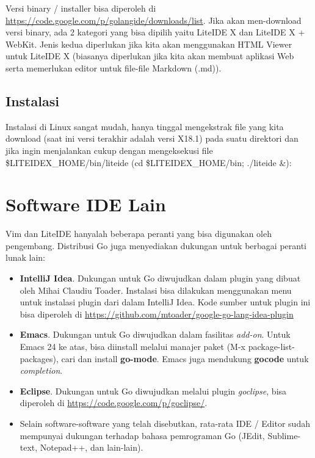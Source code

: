 Versi binary / installer bisa diperoleh di \url{https://code.google.com/p/golangide/downloads/list}. Jika akan men-download versi binary, ada 2 kategori yang bisa dipilih yaitu LiteIDE X dan LiteIDE X + WebKit. Jenis kedua diperlukan jika kita akan menggunakan HTML Viewer untuk LiteIDE X (biasanya diperlukan jika kita akan membuat aplikasi Web serta memerlukan editor untuk file-file Markdown (.md)).

\subsection{Instalasi}

Instalasi di Linux sangat mudah, hanya tinggal mengekstrak file yang kita download (saat ini versi terakhir adalah versi X18.1) pada suatu direktori dan jika ingin menjalankan cukup dengan mengeksekusi file \$LITEIDEX\_HOME/bin/liteide (cd \$LITEIDEX\_HOME/bin; ./liteide \&):

\section{Software IDE Lain}

Vim dan LiteIDE hanyalah beberapa peranti yang bisa digunakan oleh pengembang. Distribusi Go juga menyediakan dukungan untuk berbagai peranti lunak lain:
\begin{itemize}
  \item \textbf{IntelliJ Idea}. Dukungan untuk Go diwujudkan dalam plugin yang dibuat oleh Mihai Claudiu Toader. Instalasi bisa dilakukan menggunakan menu untuk instalasi plugin dari dalam IntelliJ Idea. Kode sumber untuk plugin ini bisa diperoleh di \url{https://github.com/mtoader/google-go-lang-idea-plugin}
  \item \textbf{Emacs}. Dukungan untuk Go diwujudkan dalam fasilitas \textit{add-on}. Untuk Emacs 24 ke atas, bisa diinstall melalui manajer paket (M-x package-list-packages), cari dan install \textbf{go-mode}. Emacs juga mendukung \textbf{gocode} untuk \textit{completion}.
  \item \textbf{Eclipse}. Dukungan untuk Go diwujudkan melalui plugin \textit{goclipse}, bisa diperoleh di \url{https://code.google.com/p/goclipse/}.
  \item Selain software-software yang telah disebutkan, rata-rata IDE / Editor sudah mempunyai dukungan terhadap bahasa pemrograman Go (JEdit, Sublime-text, Notepad++, dan lain-lain).
\end{itemize}
